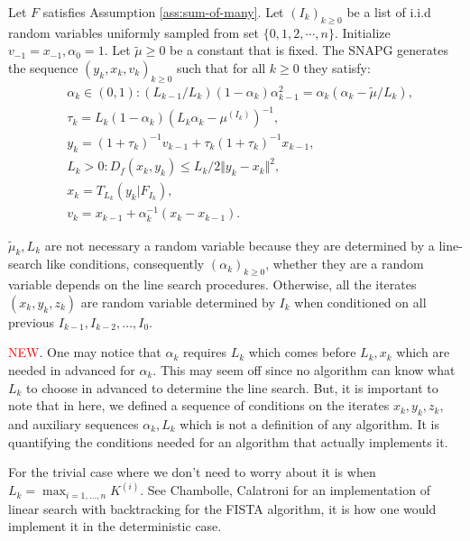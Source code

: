 \documentclass[12pt]{article}
\begin{document}
        \begin{definition}[SNAPG-V2]\label{def:snapg-v2}
            Let $F$ satisfies Assumption \ref{ass:sum-of-many}. 
            Let $(I_k)_{k \ge 0}$ be a list of i.i.d random variables uniformly sampled from set $\{0, 1, 2, \cdots, n\}$. 
            Initialize $v_{-1} = x_{-1}, \alpha_0 = 1$. 
            Let $\tilde \mu \ge 0$ be a constant that is fixed.
            The SNAPG generates the sequence $(y_k, x_k, v_k)_{k \ge 0}$ such that for all $k \ge 0$ they satisfy: 
            \begin{align*}
                & \alpha_k \in (0, 1): (L_{k - 1}/L_k)(1 - \alpha_{k})\alpha_{k - 1}^2 = \alpha_{k}\left(\alpha_{k} - \tilde \mu/L_k\right), \\
                & \tau_k = L_k(1 - \alpha_k)\left(L_k \alpha_k - \mu^{(I_k)}\right)^{-1}, \\
                & y_k = (1 + \tau_k)^{-1}v_{k - 1} + \tau_k(1 + \tau_k)^{-1}x_{k - 1}, \\
                & L_k > 0: D_f(x_k, y_k) \le L_k/2\Vert y_k - x_k\Vert^2, \\
                & x_k =  T_{L_k}(y_k | F_{I_k}), \\
                & v_k = x_{k - 1} + \alpha_k^{-1}(x_k - x_{k - 1}). 
            \end{align*}
        \end{definition}
        \begin{remark}
            $\tilde \mu_k, L_k$ are not necessary a random variable because they are determined by a line-search like conditions, consequently $(\alpha_k)_{k\ge 0}$, whether they are a random variable depends on the line search procedures. 
            Otherwise, all the iterates $(x_k, y_k, z_k)$ are random variable determined by $I_k$ when conditioned on all previous $I_{k - 1}, I_{k - 2}, \ldots, I_{0}$. 
            \par
            \textcolor{red}{NEW}. One may notice that $\alpha_k$ requires $L_k$ which comes before $L_k, x_k$ which are needed in advanced for $\alpha_k$. 
            This may seem off since no algorithm can know what $L_k$ to choose in advanced to determine the line search. 
            But, it is important to note that in here, we defined a sequence of conditions on the iterates $x_k, y_k, z_k$, and auxiliary sequences $\alpha_k, L_k$ which is not a definition of any algorithm. 
            It is quantifying the conditions needed for an algorithm that actually implements it.
            \par
            For the trivial case where we don't need to worry about it is when $L_k = \max_{i = 1, \ldots, n} K^{(i)}$. 
            See Chambolle, Calatroni \cite{calatroni_backtracking_2019} for an implementation of linear search with backtracking for the FISTA algorithm, it is how one would implement it in the deterministic case. 
        \end{remark}
        
\end{document}
